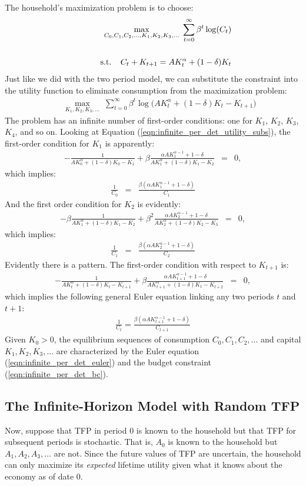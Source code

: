 \documentclass[12pt,fleqn]{article}
\newcommand{\EE}{\begin{eqnarray}}
\newcommand{\FF}{\end{eqnarray}}
\newcommand{\tn}{\textnormal}
\begin{document}
The household's maximization problem is to choose:
	\EE
	&&\max_{C_0,C_1,C_2,\ldots,K_1,K_2,K_3,\ldots} \; \sum_{t=0}^{\infty}\beta^t\log (C_t) \\\nonumber\\
	&& \; \; \; \;  \; \; \; \; \tn{s.t.} \; \; \; \; C_t + K_{t+1} = A K_{t}^{\alpha}  + (1-\delta)K_t\nonumber
	\FF 
Just like we did with the two period model, we can substitute the constraint into the utility function to eliminate consumption from the maximization problem:
	\EE
	&&\max_{K_1,K_2,K_3,\ldots} \; \sum_{t=0}^{\infty}\beta^t\log \Big(A K_{t}^{\alpha}  + (1-\delta)K_t - K_{t+1}\Big) 
	\FF 
The problem has an infinite number of first-order conditions: one for $K_1$, $K_2$, $K_3$, $K_4$, and so on. Looking at Equation (\ref{eqn:infinite_per_det_utility_subs}), the first-order condition for $K_1$ is apparently:
	\EE
	-\frac{1}{A K_{0}^{\alpha}  + (1-\delta)K_0 - K_{1}} + \beta\frac{\alpha A K_{1}^{\alpha-1}  + 1-\delta}{A K_{1}^{\alpha}  + (1-\delta)K_1 - K_{2}} & = & 0,
	\FF
which implies:
	\EE
	\frac{1}{C_0} & = & \frac{\beta\left(\alpha A K_1^{\alpha - 1} + 1 - \delta\right)}{C_1}
	\FF
And the first order condition for $K_2$ is evidently:
	\EE
	-\beta\frac{1}{A K_{1}^{\alpha}  + (1-\delta)K_1 - K_{2}} + \beta^2\frac{\alpha A K_{2}^{\alpha-1}  + 1-\delta}{A K_{2}^{\alpha}  + (1-\delta)K_2 - K_{3}} & = & 0,
	\FF
which implies:
	\EE
	\frac{1}{C_1} & = & \frac{\beta\left(\alpha A K_2^{\alpha - 1} + 1 - \delta\right)}{C_2}
	\FF
Evidently there is a pattern. The first-order condition with respect to $K_{t+1}$ is:
	\EE
	-\frac{1}{A K_{t}^{\alpha}  + (1-\delta)K_t - K_{t+1}} + \beta\frac{\alpha A K_{t+1}^{\alpha-1}  + 1-\delta}{A K_{t+1}^{\alpha}  + (1-\delta)K_1 - K_{t+2}} & = & 0,
	\FF
which implies the following general Euler equation linking any two periods $t$ and $t+1$:
	\EE
	\boxed{\frac{1}{C_t} = \frac{\beta\left(\alpha A K_{t+1}^{\alpha - 1} + 1 - \delta\right)}{C_{t+1}}} \label{eqn:infinite_per_det_euler}
	\FF
Given $K_0>0$, the equilibrium sequences of consumption $C_0, C_1, C_2, \ldots$ and capital $K_1, K_2, K_3, \ldots$ are characterized by the Euler equation (\ref{eqn:infinite_per_det_euler}) and the budget constraint (\ref{eqn:infinite_per_det_bc}).
	
	
	
\subsection{The Infinite-Horizon Model with Random TFP}


Now, suppose that TFP in period 0 is known to the household but that TFP for subsequent periods is stochastic. That is, $A_0$ is known to the household but $A_1, A_2, A_3, \ldots$ are not. Since the future values of TFP are uncertain, the household can only maximize its \emph{expected} lifetime utility given what it knows about the economy as of date 0.
\end{document}
